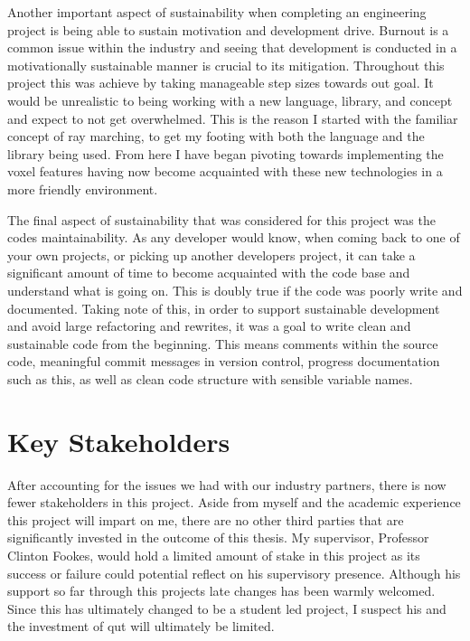 \documentclass[titlepage]{article}
\begin{document}
Another important aspect of sustainability when completing an engineering project is being able to sustain motivation and development drive. Burnout is a common issue within the industry and seeing that development is conducted in a motivationally sustainable manner is crucial to its mitigation. Throughout this project this was achieve by taking manageable step sizes towards out goal. It would be unrealistic to being working with a new language, library, and concept and expect to not get overwhelmed. This is the reason I started with the familiar concept of ray marching, to get my footing with both the language and the library being used. From here I have began pivoting towards implementing the voxel features having now become acquainted with these new technologies in a more friendly environment.

The final aspect of sustainability that was considered for this project was the codes maintainability. As any developer would know, when coming back to one of your own projects, or picking up another developers project, it can take a significant amount of time to become acquainted with the code base and understand what is going on. This is doubly true if the code was poorly write and documented. Taking note of this, in order to support sustainable development and avoid large refactoring and rewrites, it was a goal to write clean and sustainable code from the beginning. This means comments within the source code, meaningful commit messages in version control, progress documentation such as this, as well as clean code structure with sensible variable names.

\section{Key Stakeholders}
After accounting for the issues we had with our industry partners, there is now fewer stakeholders in this project. Aside from myself and the academic experience this project will impart on me, there are no other third parties that are significantly invested in the outcome of this thesis. My supervisor, Professor Clinton Fookes, would hold a limited amount of stake in this project as its success or failure could potential reflect on his supervisory presence. Although his support so far through this projects late changes has been warmly welcomed. Since this has ultimately changed to be a student led project, I suspect his and the investment of \acrshort{qut} will ultimately be limited.

\appendix
\end{document}
